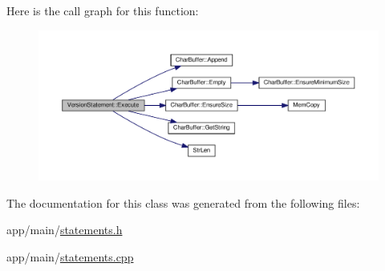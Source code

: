 Here is the call graph for this function\+:
\nopagebreak
\begin{figure}[H]
\begin{center}
\leavevmode
\includegraphics[width=350pt]{de/de7/classVersionStatement_a0601a810472862583ef4c702c6f1fd0a_cgraph}
\end{center}
\end{figure}




The documentation for this class was generated from the following files\+:\begin{DoxyCompactItemize}
\item 
app/main/\hyperlink{statements_8h}{statements.\+h}\item 
app/main/\hyperlink{statements_8cpp}{statements.\+cpp}\end{DoxyCompactItemize}
